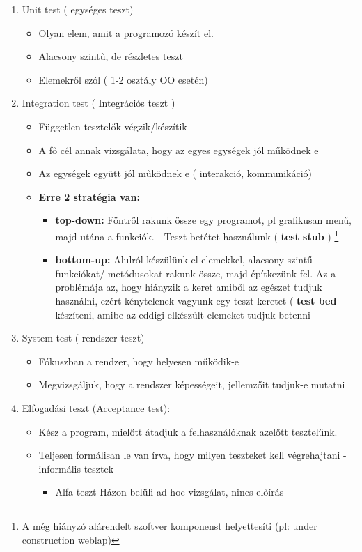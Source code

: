 	\begin{enumerate}
		\item Unit test ( egységes teszt)
			\begin{itemize}
				\item Olyan elem, amit a programozó készít el.
				\item Alacsony szintű, de részletes teszt
				\item Elemekről szól ( 1-2 osztály OO esetén)
			\end{itemize}

		\item Integration test ( Integrációs teszt )
			\begin{itemize}
				\item Független tesztelők végzik/készítik
				\item A fő cél annak vizsgálata, hogy az egyes egységek jól működnek e
				\item Az egységek együtt jól működnek e ( interakció, kommunikáció)
				\item \textbf{Erre 2 stratégia van: }
					\begin{itemize}
						\item \textbf{top-down:} Föntről rakunk össze egy programot, pl grafikusan menű, majd utána a funkciók. - Teszt betétet használunk ( \textbf{test stub} )	\footnote{A még hiányzó alárendelt szoftver komponenst helyettesíti (pl: under construction weblap)}
						\item \textbf{bottom-up:} Alulról készülünk el elemekkel, alacsony szintű funkciókat/ metódusokat rakunk össze, majd építkezünk fel. Az a problémája az, hogy hiányzik a keret amiből az egészet tudjuk használni, ezért kénytelenek vagyunk egy teszt keretet ( \textbf{test bed } készíteni, amibe az eddigi elkészült elemeket tudjuk betenni
					\end{itemize}
			\end{itemize}

		\item System test ( rendszer teszt)
			\begin{itemize}
				\item Fókuszban a rendzer, hogy helyesen működik-e
				\item Megvizsgáljuk, hogy a rendszer képességeit, jellemzőit tudjuk-e mutatni
			\end{itemize}

		\item Elfogadási teszt (Acceptance test):
			\begin{itemize}
				\item Kész a program, mielőtt átadjuk a felhasználóknak azelőtt tesztelünk.
				\item Teljesen formálisan le van írva, hogy milyen teszteket kell végrehajtani - informális tesztek
				\begin{itemize}
					\item Alfa teszt
					Házon belüli ad-hoc vizsgálat, nincs előírás


\end{itemize}
\end{itemize}
\end{enumerate}
